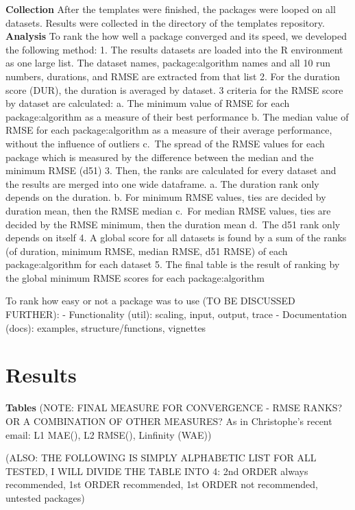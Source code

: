 \textbf{Collection} After the templates were finished, the packages were
looped on all datasets. Results were collected in the directory of the
templates repository. \textbf{Analysis} To rank the how well a package
converged and its speed, we developed the following method: 1. The
results datasets are loaded into the R environment as one large list.
The dataset names, package:algorithm names and all 10 run numbers,
durations, and RMSE are extracted from that list 2. For the duration
score (DUR), the duration is averaged by dataset. 3 criteria for the
RMSE score by dataset are calculated: a. The minimum value of RMSE for
each package:algorithm as a measure of their best performance b. The
median value of RMSE for each package:algorithm as a measure of their
average performance, without the influence of outliers c.~The spread of
the RMSE values for each package which is measured by the difference
between the median and the minimum RMSE (d51) 3. Then, the ranks are
calculated for every dataset and the results are merged into one wide
dataframe. a. The duration rank only depends on the duration. b. For
minimum RMSE values, ties are decided by duration mean, then the RMSE
median c.~For median RMSE values, ties are decided by the RMSE minimum,
then the duration mean d.~The d51 rank only depends on itself 4. A
global score for all datasets is found by a sum of the ranks (of
duration, minimum RMSE, median RMSE, d51 RMSE) of each package:algorithm
for each dataset 5. The final table is the result of ranking by the
global minimum RMSE scores for each package:algorithm

To rank how easy or not a package was to use (TO BE DISCUSSED FURTHER):
- Functionality (util): scaling, input, output, trace - Documentation
(docs): examples, structure/functions, vignettes

\hypertarget{results}{%
\section{Results}\label{results}}

\textbf{Tables} (NOTE: FINAL MEASURE FOR CONVERGENCE - RMSE RANKS? OR A
COMBINATION OF OTHER MEASURES? As in Christophe's recent email: L1
MAE(), L2 RMSE(), Linfinity (WAE))

(ALSO: THE FOLLOWING IS SIMPLY ALPHABETIC LIST FOR ALL TESTED, I WILL
DIVIDE THE TABLE INTO 4: 2nd ORDER always recommended, 1st ORDER
recommended, 1st ORDER not recommended, untested packages)

